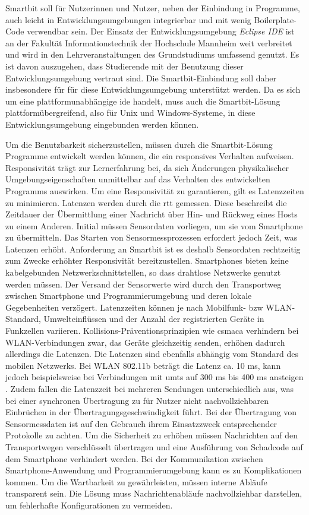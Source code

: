 \documentclass[11pt,a4paper]{report}
\begin{document}
Smartbit soll für Nutzerinnen und Nutzer, neben der Einbindung in Programme, auch leicht in Entwicklungsumgebungen integrierbar und mit wenig Boilerplate-Code verwendbar sein.
Der Einsatz der Entwicklungsumgebung \textit{Eclipse IDE} \cite{eclipse-ide} ist an der Fakultät Informationstechnik der Hochschule Mannheim weit verbreitet und wird in den Lehrveranstaltungen des Grundstudiums umfassend genutzt.
Es ist davon auszugehen, dass Studierende mit der Benutzung dieser Entwicklungsumgebung vertraut sind.
Die Smartbit-Einbindung soll daher insbesondere für für diese Entwicklungsumgebung unterstützt werden.
Da es sich um eine plattformunabhängige \acrfull{ide} handelt, muss auch die Smartbit-Lösung plattformübergreifend, also für Unix und Windows-Systeme, in diese Entwicklungsumgebung eingebunden werden können.

Um die Benutzbarkeit sicherzustellen, müssen durch die Smartbit-Lösung Programme entwickelt werden können, die ein responsives Verhalten aufweisen.
Responsivität trägt zur Lernerfahrung bei, da sich Änderungen physikalischer Umgebungseigenschaften unmittelbar auf das Verhalten des entwickelten Programms auswirken.
Um eine Responsivität zu garantieren, gilt es Latenzzeiten zu minimieren.
Latenzen werden durch die \acrfull{rtt} gemessen.
Diese beschreibt die Zeitdauer der Übermittlung einer Nachricht über Hin- und Rückweg eines Hosts zu einem Anderen.
Initial müssen Sensordaten vorliegen, um sie vom Smartphone zu übermitteln.
Das Starten von Sensormessprozessen erfordert jedoch Zeit, was Latenzen erhöht.
Anforderung an Smartbit ist es deshalb Sensordaten rechtzeitig zum Zwecke erhöhter Responsivität bereitzustellen. 
Smartphones bieten keine kabelgebunden Netzwerkschnittstellen, so dass drahtlose Netzwerke genutzt werden müssen.
Der Versand der Sensorwerte wird durch den Transportweg zwischen Smartphone und Programmierumgebung und deren lokale Gegebenheiten verzögert.
Latenzzeiten können je nach Mobilfunk- bzw WLAN-Standard, Umwelteinflüssen und der Anzahl der registrierten Geräte in Funkzellen variieren.
Kollisions-Präventionsprinzipien wie \acrfull{csmaca} verhindern bei WLAN-Verbindungen zwar, das Geräte gleichzeitig senden, erhöhen dadurch allerdings die Latenzen.
Die Latenzen sind ebenfalls abhängig vom Standard des mobilen Netzwerks.
Bei WLAN 802.11b beträgt die Latenz ca. 10 ms, kann jedoch beispielsweise bei Verbindungen mit \acrfull{umts} auf 300 ms bis 400 ms ansteigen \cite{network_latencies}.
Zudem fallen die Latenzzeit bei mehreren Sendungen unterschiedlich aus, was bei einer synchronen Übertragung zu für Nutzer nicht nachvollziehbaren Einbrüchen  in der Übertragungsgeschwindigkeit führt.
Bei der Übertragung von Sensormessdaten ist auf den Gebrauch ihrem Einsatzzweck entsprechender Protokolle zu achten.
Um die Sicherheit zu erhöhen müssen Nachrichten auf den Transportwegen verschlüsselt übertragen und eine Ausführung von Schadcode auf dem Smartphone verhindert werden.
Bei der Kommunikation zwischen Smartphone-Anwendung und Programmierumgebung kann es zu Komplikationen kommen.
Um die Wartbarkeit zu gewährleisten, müssen interne Abläufe transparent sein.
Die Lösung muss Nachrichtenabläufe nachvollziehbar darstellen, um fehlerhafte Konfigurationen zu vermeiden.
\end{document}
